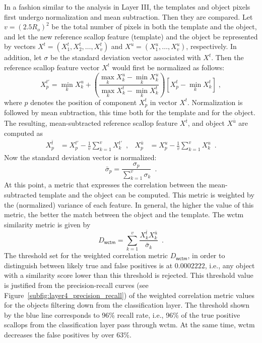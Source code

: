 In a fashion similar to the analysis in Layer III, the templates and object pixels first undergo normalization and mean subtraction.
Then they are compared.
Let $v=(2.5R_o)^2$ be the total number of pixels in both the template and the object, and let the new reference scallop feature (template) and the object be represented by vectors $X^t=(X^t_1,X^t_2, \ldots,X^t_{v})$ and $X^u=(X^u_1,\ldots,X^u_{v})$, respectively. 
In addition, let $\sigma$ be the standard deviation vector associated with $X^t$.
Then the reference scallop feature vector $X^t$ would first be normalized as follows: 
%
\[
X^{t'}_p = \min_{k} X^u_k + \left(\frac{\max \limits_{k} X^u_k-\min \limits_{k} X^u_k}{\max \limits_{k} X^{t}_k-\min \limits _{k} X^{t}_k}
\right)\left[ X^{t}_p-\min_{k} X^{t}_k \right] \; ,
\]
%
where $p$ denotes the position of component $X^t_p$ in vector $X^t$.
Normalization is followed by mean subtraction, this time both for the template and for the object. 
The resulting, mean-subtracted reference scallop feature $X^{\bar{t}}$, and object $X^{\bar{u}}$ are computed as
%
\begin{align*}
X^{\bar{t}}_p &= X^{t'}_p-\frac{1}{v}\sum_{k=1}^{v}X^{t'}_k \enspace,& 
X^{\bar{u}}_p &= X^{u}_p-\frac{1}{v}\sum_{k=1}^{v}X^{u}_k \enspace.
\end{align*}
%
Now the standard deviation vector is normalized:
%
\[
\bar{\sigma}_p = \frac{\sigma_p}{\sum_{k=1}^{v}\sigma_k} \enspace.
\]
%
At this point, a metric that expresses the correlation between the mean-subtracted template and the object can be computed.
This metric is weighted by the (normalized) variance of each feature. 
In general, the higher the value of this metric, the better the match between the object and the template. 
The \gls{wctm} similarity metric is given by
%
\[
D_\mathsf{wctm} = \sum_{k=1}^v\frac{X^{\bar{t}}_{k}X^{\bar{u}}_k}{\bar{\sigma}_{k}} \enspace .
\]
%
The threshold set for the weighted correlation metric $D_\mathsf{wctm}$, in order to distinguish between likely true and false positives is at $0.0002222$, i.e., any object with a similarity score lower than this threshold is rejected. 
This threshold value is justified from the precision-recall curves (see Figure~\ref{subfig:layer4_precision_recall}) of the weighted correlation metric values for the objects filtering down from the classification layer. 
The threshold shown by the blue line corresponds to 96\% recall rate, i.e., 96\% of the true positive scallops from the classification layer pass through \gls{wctm}. 
At the same time, \gls{wctm} decreases the false positives by over 63\%.
